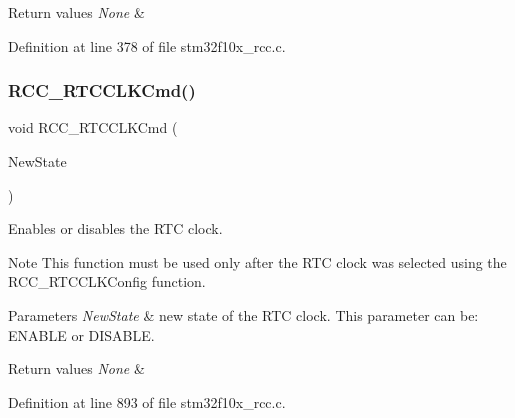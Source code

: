 \begin{DoxyRetVals}{Return values}
{\em None} & \\
\hline
\end{DoxyRetVals}


Definition at line 378 of file stm32f10x\+\_\+rcc.\+c.

\mbox{\label{group___r_c_c___exported___functions_ga9802f84846df2cea8e369234ed13b159}} 
\subsubsection{\texorpdfstring{R\+C\+C\+\_\+\+R\+T\+C\+C\+L\+K\+Cmd()}{RCC\_RTCCLKCmd()}}
{\footnotesize\ttfamily void R\+C\+C\+\_\+\+R\+T\+C\+C\+L\+K\+Cmd (\begin{DoxyParamCaption}\item[{\hyperlink{group___exported__types_gac9a7e9a35d2513ec15c3b537aaa4fba1}{Functional\+State}}]{New\+State }\end{DoxyParamCaption})}



Enables or disables the R\+TC clock. 

\begin{DoxyNote}{Note}
This function must be used only after the R\+TC clock was selected using the R\+C\+C\+\_\+\+R\+T\+C\+C\+L\+K\+Config function. 
\end{DoxyNote}

\begin{DoxyParams}{Parameters}
{\em New\+State} & new state of the R\+TC clock. This parameter can be\+: E\+N\+A\+B\+LE or D\+I\+S\+A\+B\+LE. \\
\hline
\end{DoxyParams}

\begin{DoxyRetVals}{Return values}
{\em None} & \\
\hline
\end{DoxyRetVals}


Definition at line 893 of file stm32f10x\+\_\+rcc.\+c.

\mbox{\label{group___r_c_c___exported___functions_ga1473d8a5a020642966359611c44181b0}} 
